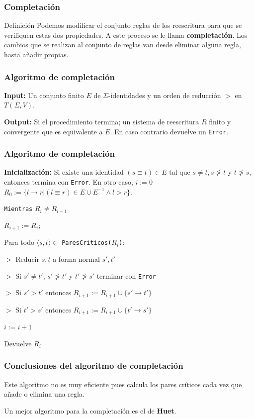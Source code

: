 \documentclass{beamer}
\begin{document}
\begin{frame}
  \frametitle{Completación}

  \begin{block}{Definición}
    Podemos modificar el conjunto reglas de los reescritura para que
    se verifiquen estas dos propiedades. A este proceso se le llama
    \textbf{completación}. Los cambios que se realizan al conjunto de
    reglas van desde eliminar alguna regla, hasta añadir propias.
  \end{block}
  
\end{frame}

\begin{frame}
  \frametitle{Algoritmo de completación}

  \textbf{Input:} Un conjunto finito $E$ de $\Sigma$-identidades y un
  orden de reducción $>$ en $T(\Sigma, V)$.

  \textbf{Output:} Si el procedimiento termina; un sistema de
  reescritura $R$ finito y convergente que es equivalente a $E$. En
  caso contrario devuelve un \texttt{Error}.

\end{frame}

\begin{frame}
  \frametitle{Algoritmo de completación}

\textbf{Inicialización:}
Si existe una identidad $(s \equiv t) \in E$ tal que
$s \not = t, s \not > t$ y $t \not > s$, entonces termina con
\texttt{Error}.
En otro caso,
$i := 0$
$R_0 := \{l \rightarrow r | (l \equiv r) \in E \cup E^{-1} \wedge l > r \}$.

\texttt{Mientras} $R_i \not = R_{i-1}$

$R_{i+1} := R_i$;

Para todo $\langle s, t \rangle \in$ \texttt{ParesCriticos($R_i$)}:

$>$ Reducir $s,t$ a forma normal $s', t'$

$>$ Si $s' \not = t'$, $s' \not > t'$ y $t' \not > s'$ terminar con \texttt{Error}

$>$ Si $s' > t'$ entonces $R_{i+1} := R_{i+1} \cup \{s' \rightarrow t'\}$

$>$ Si $t' > s'$ entonces $R_{i+1} := R_{i+1} \cup \{t' \rightarrow s'\}$

$i := i+1$

Devuelve $R_i$

\end{frame}

\begin{frame}
  \frametitle{Conclusiones del algoritmo de completación}
  \begin{block}{}
    Este algoritmo no es muy eficiente pues calcula los pares críticos
    cada vez que añade o elimina una regla.
  \end{block}

  \begin{block}{}
    Un mejor algoritmo para la completación es el de \textbf{Huet}.
  \end{block}
\end{frame}
\end{document}
